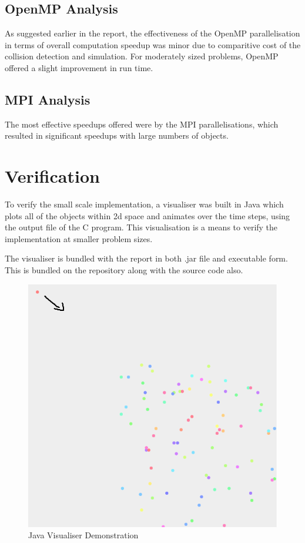 \documentclass[twoside,twocolumn]{article}
\begin{document}
	\subsection{OpenMP Analysis}
	As suggested earlier in the report, the effectiveness of the OpenMP parallelisation in terms of overall computation speedup was minor due to comparitive cost of the collision detection and simulation. For moderately sized problems, OpenMP offered a slight improvement in run time.
	
	\subsection{MPI Analysis}
	The most effective speedups offered were by the MPI parallelisations, which resulted in significant speedups with large numbers of objects. 
	
	
	\newpage
	\section{Verification}
	
	To verify the small scale implementation, a visualiser was built in Java which plots all of the objects within 2d space and animates over the time steps, using the output file of the C program. This visualisation is a means to verify the implementation at smaller problem sizes. \newline
	
	The visualiser is bundled with the report in both .jar file and executable form. This is bundled on the repository along with the source code also. \newline
	
	\begin{figure}
		\caption{Java Visualiser Demonstration}
		\includegraphics[scale=.4]{picvis.png}
	\end{figure}
	
\end{document}
